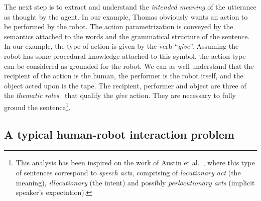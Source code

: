 \documentclass{svmult}
\newcommand{\ie}{{\textit{i.e.~}}}
\begin{document}
The next step is to extract and understand the \emph{intended meaning} of the utterance
as thought by the agent. In our example, Thomas obviously wants an action to be
performed by the robot. The action parametrization is conveyed by the semantics
attached to the words and the grammatical structure of the sentence. In our
example, the type of action is given by the verb ``\textit{give}''. Assuming
the robot has some procedural knowledge attached to this symbol, the action
type can be considered as grounded for the robot. We can as well understand
that the recipient of the action is the human, the performer is the robot
itself, and the object acted upon is the tape. The recipient, performer and object are three of the
\emph{thematic roles}~\cite{Gruber1965} that qualify the \emph{give} action. They are necessary to fully ground the sentence\footnote{This analysis has been
inspired on the work of Austin et al.~\cite{Austin1962}, where this type of
sentences correspond to \emph{speech acts}, comprising of \emph{locutionary
act} (the meaning), \emph{illocutionary} (the intent) and possibly
\emph{perlocutionary acts} (implicit speaker's expectation).}.



\subsection{A typical human-robot interaction problem}\label{sec:problem}

\end{document}
